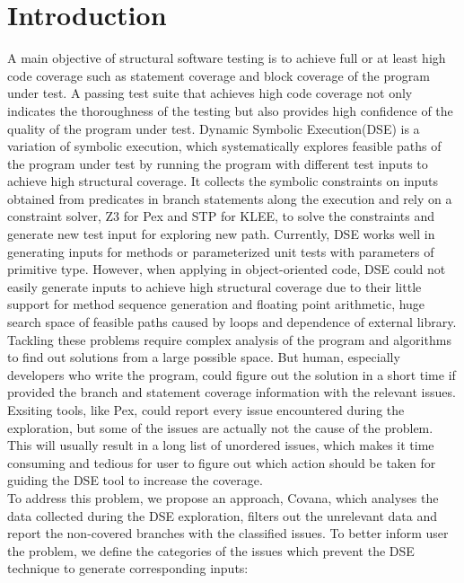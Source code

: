 \section{Introduction}
A main objective of structural software testing is to achieve full or at least high code coverage such as statement coverage\cite{stateCovBook} and block coverage\cite{branch} of the program under test. A passing test suite that achieves high code coverage not only indicates the thoroughness of the testing but also provides high confidence of the quality of the program under test. Dynamic Symbolic Execution(DSE)\cite{CadarGPDE06,GodefroidKS05,SenMA05} is a variation of symbolic execution, which systematically explores feasible paths of the program under test by running the program with different test inputs to achieve high structural coverage. It collects the symbolic constraints on inputs obtained from predicates in branch statements along the execution and rely on a constraint solver, Z3 for Pex\cite{TillmannH08} and STP\cite{stp} for KLEE\cite{klee}, to solve the constraints and generate new test input for exploring new path. Currently, DSE works well in generating inputs for methods or parameterized unit tests with parameters of primitive type. However, when applying in object-oriented code, DSE could not easily generate inputs to achieve high structural coverage due to their little support for method sequence generation and floating point arithmetic, huge search space of feasible paths caused by loops and dependence of external library. Tackling these problems require complex analysis of the program and algorithms to find out solutions from a large possible space. But human, especially developers who write the program, could figure out the solution in a short time if provided the branch and statement coverage information with the relevant issues. Exsiting tools, like Pex, could report every issue encountered during the exploration, but some of the issues are actually not the cause of the problem. This will usually result in a long list of unordered issues, which makes it time consuming and tedious for user to figure out which action should be taken for guiding the DSE tool to increase the coverage.
\\To address this problem, we propose an approach, Covana, which analyses the data collected during the DSE exploration, filters out the unrelevant data and report the non-covered branches with the classified issues. To better inform user the problem, we define the categories of the issues which prevent the DSE technique to generate corresponding inputs:
